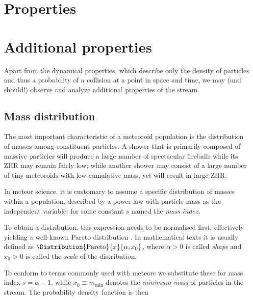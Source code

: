 \section{Properties} \label{mp}

    \section{Additional properties} \label{mpa}
        Apart from the dynamical properties, which describe only the density of particles
        and thus a probability of a collision at a point in space and time,
        we may (and should!) observe and analyze additional properties of the stream.

        \subsection{Mass distribution} \label{mpam}
            The most important characteristic of a meteoroid population is the distribution of masses
            among constituent particles. A shower that is primarily composed of massive particles
            will produce a large number of spectacular fireballs while its ZHR may remain fairly low;
            while another shower may consist of a large number of tiny meteoroids with low cumulative mass,
            yet will result in large ZHR.

            In meteor science, it is customary to assume a specific distribution of masses within a population,
            described by a power law with particle mass as the independent variable:
            for some constant $s$ named the \emph{mass index}.

            To obtain a distribution, this expression needs to be normalised first,
            effectively yielding a well-known Pareto distribution \citep{arnold1983}.
            In mathematical texts it is usually defined as $\Distribution{\mathrm{Pareto}}{x}{\alpha, x_0}$,
            where $\alpha > 0$ is called \emph{shape} and $x_0 > 0$ is called the \emph{scale} of the distribution.

            To conform to terms commonly used with meteors we substitute these for mass index
            $s = \alpha - 1$, while $x_0 \equiv m_\mathrm{min}$ denotes the \emph{minimum mass} of particles in the stream.
            The probability density function is then 

